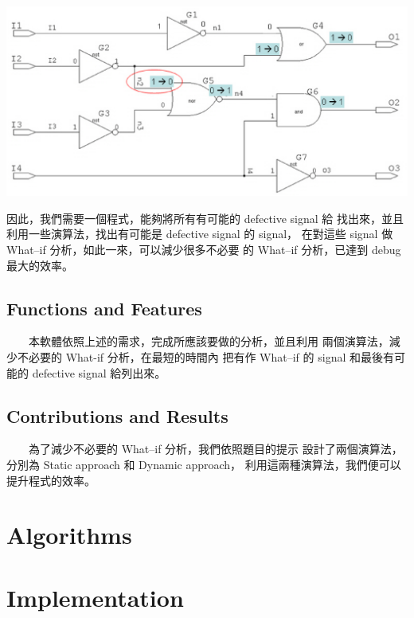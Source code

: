 \documentclass[12pt,a4paper]{article}
\begin{document}
\begin{center}
\includegraphics[scale=0.6]{imgs/02.eps}
\end{center}

    因此，我們需要一個程式，能夠將所有有可能的 defective signal 給%
找出來，並且利用一些演算法，找出有可能是 defective signal 的 signal，%
在對這些 signal 做 What–if 分析，如此一來，可以減少很多不必要%
的 What–if 分析，已達到 debug 最大的效率。

\subsection{Functions and Features}

　　本軟體依照上述的需求，完成所應該要做的分析，並且利用%
兩個演算法，減少不必要的 What-if 分析，在最短的時間內%
把有作 What–if 的 signal 和最後有可能的 defective signal 給列出來。%

\subsection{Contributions and Results}

　　為了減少不必要的 What–if 分析，我們依照題目的提示%
設計了兩個演算法，分別為 Static approach 和 Dynamic approach，%
利用這兩種演算法，我們便可以提升程式的效率。

\section{Algorithms}

\section{Implementation}
\end{document}
